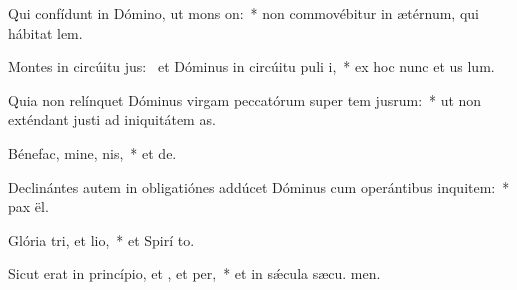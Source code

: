 \item Qui confídunt in Dómino, ut mons on:~* non commovébitur in ætérnum, qui hábitat  lem.
\item Montes in circúitu jus:~\pscross{} et Dóminus in circúitu puli i,~* ex hoc nunc et us  lum.
\item Quia non relínquet Dóminus virgam peccatórum super tem jusrum:~* ut non exténdant justi ad iniquitátem  as.
\item Bénefac, mine, nis,~* et  de.
\item Declinántes autem in obligatiónes addúcet Dóminus cum operántibus inquitem:~* pax  ël.
\item Glória tri, et lio,~* et Spirí to.
\item Sicut erat in princípio, et , et per,~* et in sǽcula sæcu. men.
